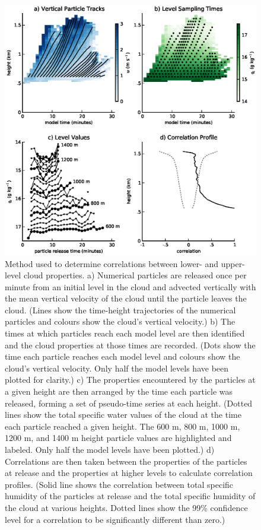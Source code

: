 \documentclass[acp]{copernicus}
\begin{document}
\begin{figure}[t]
\vspace*{2mm}
\begin{center}
\includegraphics[width=\textwidth]{./figures/cloud_base_schematic}
\end{center}
\caption{Method used to determine correlations between lower- and upper-level 
cloud properties. a) Numerical particles are released once per minute from an 
initial level in the cloud and advected vertically with the mean vertical 
velocity of the cloud until the particle leaves the cloud. (Lines show the 
time-height trajectories of the numerical particles and colours show the 
cloud's vertical velocity.) b) The times at which particles reach each model 
level are then identified and the cloud properties at those times are recorded. 
(Dots show the time each particle reaches each model level and colours
show the cloud's vertical velocity. Only half the model levels have been 
plotted for clarity.)  c) The properties encountered by the particles at a 
given height are then arranged by the time each particle was released, forming 
a set of pseudo-time series at each height. (Dotted lines show the total 
specific water values of the cloud at the time each particle reached a given 
height.  The 600 m, 800 m, 1000 m, 1200 m, and 1400 m height particle values 
are highlighted and labeled.  Only half the model levels have been plotted.)  
d) Correlations are then taken between the properties of the particles at 
release and the properties at higher levels to calculate correlation profiles. 
(Solid line shows the correlation between total specific humidity of the 
particles at release and the total specific humidity of the cloud at various
heights. Dotted lines show the 99\% confidence level for a correlation to be
significantly different than zero.)}
\label{fig:cloud_base_schematic}
\end{figure}
\end{document}
